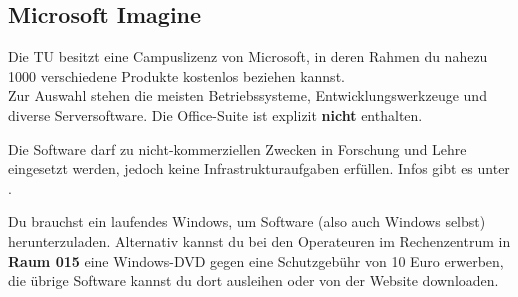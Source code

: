 
\subsection{Microsoft Imagine}
	\label{msdnaa}
	Die TU besitzt eine Campuslizenz von Microsoft, in deren Rahmen du nahezu 1000 verschiedene Produkte kostenlos beziehen kannst.\\
	Zur Auswahl stehen die meisten Betriebssysteme, Entwicklungswerkzeuge und diverse Serversoftware. Die Office-Suite ist explizit \textbf{nicht} enthalten.

	Die Software darf zu nicht-kommerziellen Zwecken in Forschung und Lehre eingesetzt werden, jedoch keine Infrastrukturaufgaben erfüllen. 
Infos gibt es unter .

	Du brauchst ein laufendes Windows, um Software (also auch Windows selbst) herunterzuladen. Alternativ kannst du bei den Operateuren im Rechenzentrum in \textbf{Raum 015} eine Windows-DVD gegen eine Schutzgebühr von 10 Euro erwerben, die übrige Software kannst du dort ausleihen oder von der Website downloaden.
